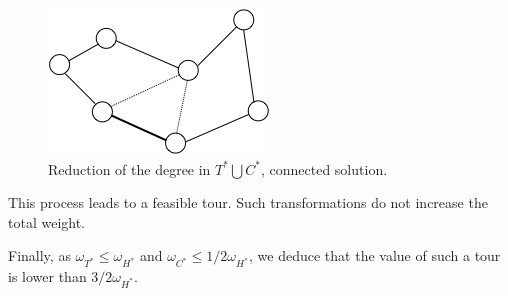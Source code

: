 \begin{figure}[hbt]
\begin{center}
       \includegraphics[scale=0.6]{FiguresGraph/christofides5}
       \caption{Reduction of the degree in $T^* \bigcup C^*$, connected solution.}
       \label{fig:christofidesFinalStep2}
\end{center}
\end{figure}

This process leads to a feasible tour. 
Such transformations do not increase the total weight.

Finally, 
as $\omega_{T^*} \leq \omega_{H^*}$ and $\omega_{C^*} \leq 1/2 \omega_{H^*}$,
we deduce that the value of such a tour is lower than $3/2 \omega_{H^*}$.
